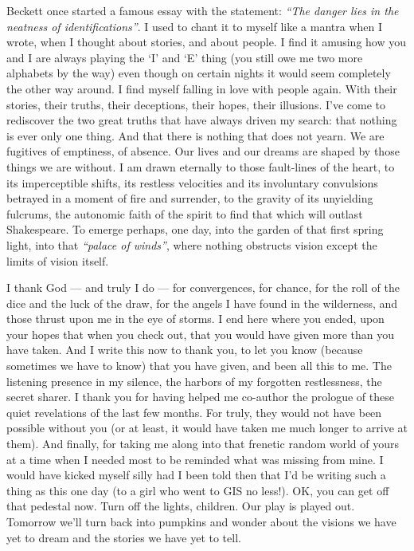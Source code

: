 \documentclass[11pt]{letter}
\begin{document}
Beckett once started a famous essay with the statement: \emph{“The danger lies in the
neatness of identifications”}. I used to chant it to myself like a mantra when I
wrote, when I thought about stories, and about people. I find it amusing how you
and I are always playing the ‘I’ and ‘E’ thing (you still owe me two more
alphabets by the way) even though on certain nights it would seem completely the
other way around. I find myself falling in love with people again. With their
stories, their truths, their deceptions, their hopes, their illusions. I’ve come
to rediscover the two great truths that have always driven my search: that
nothing is ever only one thing. And that there is nothing that does not yearn.
We are fugitives of emptiness, of absence. Our lives and our dreams are shaped
by those things we are without. I am drawn eternally to those fault-lines of the
heart, to its imperceptible shifts, its restless velocities and its involuntary
convulsions betrayed in a moment of fire and surrender, to the gravity of its
unyielding fulcrums, the autonomic faith of the spirit to find that which will
outlast Shakespeare. To emerge perhaps, one day, into the garden of that first
spring light, into that \emph{“palace of winds”}, where nothing obstructs vision except
the limits of vision itself.

I thank God --- and truly I do --- for convergences, for chance, for the roll of
the dice and the luck of the draw, for the angels I have found in the
wilderness, and those thrust upon me in the eye of storms. I end here where you
ended, upon your hopes that when you check out, that you would have given more
than you have taken. And I write this now to thank you, to let you know (because
sometimes we have to know) that you have given, and been all this to me. The
listening presence in my silence, the harbors of my forgotten restlessness, the
secret sharer. I thank you for having helped me co-author the prologue of these
quiet revelations of the last few months. For truly, they would not have been
possible without you (or at least, it would have taken me much longer to arrive
at them). And finally, for taking me along into that frenetic random world of
yours at a time when I needed most to be reminded what was missing from mine. I
would have kicked myself silly had I been told then that I’d be writing such a
thing as this one day (to a girl who went to GIS no less!). OK, you can get off
that pedestal now. Turn off the lights, children. Our play is played out.
Tomorrow we’ll turn back into pumpkins and wonder about the visions we have yet
to dream and the stories we have yet to tell.
\end{document}
